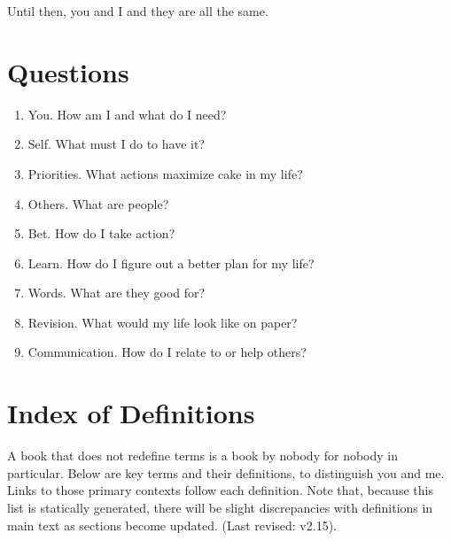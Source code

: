 \documentclass[
]{book}
\providecommand{\tightlist}{%
  \setlength{\itemsep}{0pt}\setlength{\parskip}{0pt}}
\begin{document}
Until then, you and I and they are all the same.

\hypertarget{questions}{%
\section{Questions}\label{questions}}

\begin{enumerate}
\def\labelenumi{\arabic{enumi}.}
\tightlist
\item
  You. How am I and what do I need?
\item
  Self. What must I do to have it?
\item
  Priorities. What actions maximize cake in my life?
\item
  Others. What are people?
\item
  Bet. How do I take action?
\item
  Learn. How do I figure out a better plan for my life?
\item
  Words. What are they good for?
\item
  Revision. What would my life look like on paper?
\item
  Communication. How do I relate to or help others?
\end{enumerate}

\hypertarget{index-of-definitions}{%
\section{Index of Definitions}\label{index-of-definitions}}

A book that does not redefine terms is a book by nobody for nobody in particular. Below are key terms and their definitions, to distinguish you and me. Links to those primary contexts follow each definition. Note that, because this list is statically generated, there will be slight discrepancies with definitions in main text as sections become updated. (Last revised: v2.15).
\end{document}
